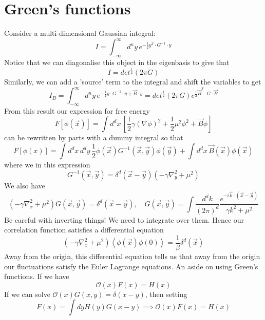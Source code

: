 \section{Green's functions} 
Consider a multi-dimensional Gaussian integral: 
\[
I = 	\int_{ - \infty } ^ \infty d^ n y \, e^{ - \frac{1}{2 } y^ T  \cdot   G^{ - 1 } \cdot  y  }
\] Notice that we can diagonalise this object 
in the eigenbasis to give that 
\[
	I = det ^{ \frac{1}{ 2}  } ( 2\pi G ) 
\] Similarly, we can add a 'source' term to the integral and shift the variables to get
\[
	I_{ B } = \int_{ - \infty } ^ \infty d^ n y \, e ^{ - \frac{1}{2 } y \cdot  G^{ -1 } \cdot  y + \vec{B} \cdot  y } = det ^{ \frac{1}{2 } } ( 2 \pi G ) e^{ \frac{1}{2 } \vec{B} ^ T \cdot  G \cdot  \vec{B}}
\] From this result our expression for free energy 
\[
	F [ \phi ( \vec{x} ) ] = \int d^ d x\, \left[  \frac{1}{2 } \gamma ( \nabla \phi ) ^  2 + \frac{1}{2 } \mu ^ 2 \phi ^ 2 + \vec{B} \phi  \right]  
\] can be rewritten by parts with a dummy integral so that 
\[
	F [ \phi ( x) ] = \int d^ d x \, d^ d y \, \frac{1}{2 } \phi ( \vec{x} ) G ^{ -1 } ( \vec{x}, \vec{y} ) \phi ( \vec{y} ) + \int d^ d x\, \vec{B} ( \vec{x} ) \phi ( \vec{x} ) 
\] where we in this expression 
\[
	G ^{ -1 } ( \vec{x} , \vec{y} ) = \delta ^ d ( \vec{x} - \vec{y} ) ( - \gamma \nabla ^ 2_y + \mu ^ 2)  
\] We also have 
\[
	( - \gamma \nabla ^ 2 _ x + \mu ^ 2 ) G ( \vec{x}, \vec{y} ) = \delta^ d ( \vec{x} - \vec{y} ) , \quad G ( \vec{x}, \vec{y} ) = \int \frac{ d^ d k }{ ( 2 \pi ) ^ d } \frac{ e^{ - i \vec{k} \cdot ( \vec{x} - \vec{y} ) } }{\gamma k ^ 2 + \mu ^ 2 }
\] Be careful with inverting things! We need to integrate over them. 
Hence our correlation function satisfies a differential equation 
\[
	( - \gamma \nabla ^ 2 _ x + \mu ^ 2 ) \left< \phi ( \vec{x} ) \phi ( 0 )  \right> = \frac{1}{\beta } \delta^ d ( \vec{x} ) 
\] Away from the origin, this differential equation tells us that away from
the origin our fluctuations satisfy the Euler Lagrange equations. 
An aside on using Green's functions. 
If we have 
\[
	\mathcal{ O }( x) F( x) = H ( x) 
\] If we can solve $ \mathcal{ O } ( x) G ( x, y) = \delta ( x - y ) $, then setting
\[
	F ( x) = \int dy H ( y ) G ( x - y ) \implies \mathcal{ O }( x) F( x) = H ( x) 
\]
